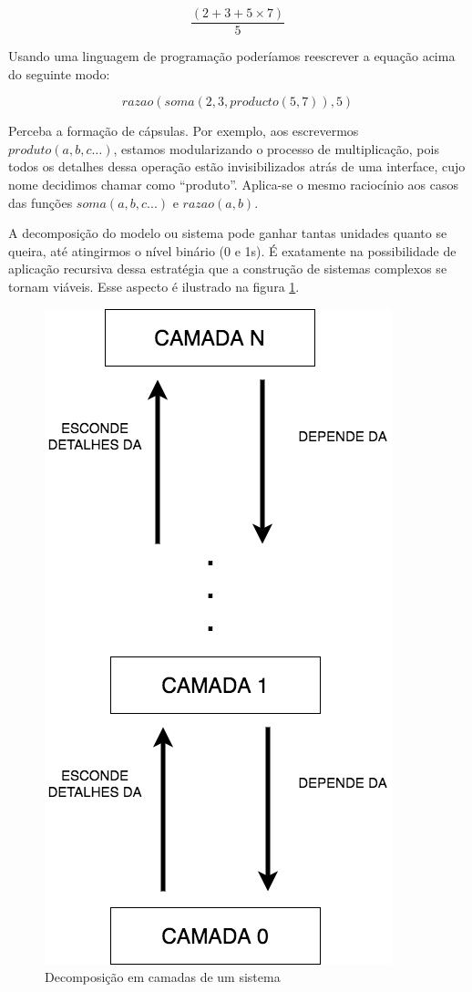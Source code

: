 $$\dfrac{(2+3+5 \times 7)}{5}$$

Usando uma linguagem de programação poderíamos reescrever a equação acima do seguinte modo:

\begin{equation*}
	\boxed{razao(\boxed{soma(2,3,\boxed{producto(5,7)})},5)}
\end{equation*}

Perceba a formação de cápsulas. Por exemplo, aos escrevermos $produto(a,b,c \dots)$, estamos modularizando o processo de multiplicação, pois todos os detalhes dessa operação estão invisibilizados atrás de uma interface, cujo nome decidimos chamar como ``produto''. Aplica-se o mesmo raciocínio aos casos das funções $soma(a, b, c...)$ e $razao(a,b)$.

A decomposição do modelo ou sistema pode ganhar tantas unidades quanto se queira, até atingirmos o nível binário (0 e 1s). É exatamente na possibilidade de aplicação recursiva dessa estratégia que a construção de sistemas complexos se tornam viáveis. Esse aspecto é ilustrado na figura \ref{fig:recursividade}.

\begin{figure}[!htb]
	\caption{Decomposição em camadas de um sistema}\label{fig:recursividade}
	\begin{center}
		\includegraphics[scale=0.55]{imagens/recursividade}
	\end{center}
\end{figure}

